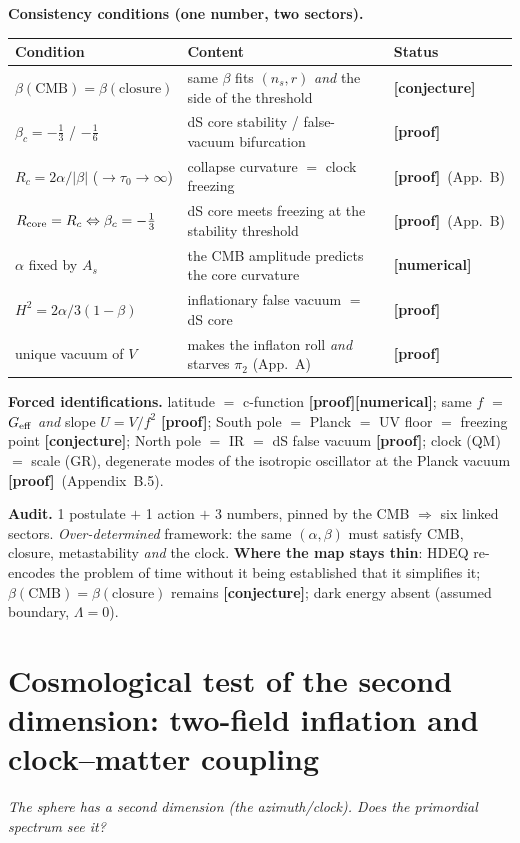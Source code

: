 \documentclass[11pt]{article}
\newcommand{\preuve}{{\small\textbf{[proof]}}}
\newcommand{\num}{{\small\textbf{[numerical]}}}
\newcommand{\conj}{{\small\textbf{[conjecture]}}}
\theoremstyle{definition}
\begin{document}
\noindent\textbf{Consistency conditions (one number, two sectors).}
\begin{center}\footnotesize
\begin{tabular}{p{4.6cm} p{6.6cm} l}
\toprule
\textbf{Condition} & \textbf{Content} & \textbf{Status}\\\midrule
$\beta(\text{CMB})=\beta(\text{closure})$ & same $\beta$ fits $(n_s,r)$ \emph{and} the side of the threshold & \conj\\
$\beta_c=-\tfrac13$ / $-\tfrac16$ & dS core stability / false-vacuum bifurcation & \preuve\\
$R_c=2\alpha/|\beta|$ ($\to\tau_0\!\to\!\infty$) & collapse curvature $=$ clock freezing & \preuve\ (App.~B)\\
$R_{\rm core}=R_c\Leftrightarrow\beta_c=-\tfrac13$ & dS core meets freezing at the stability threshold & \preuve\ (App.~B)\\
$\alpha$ fixed by $A_s$ & the CMB amplitude predicts the core curvature & \num\\
$H^2=2\alpha/3(1-\beta)$ & inflationary false vacuum $=$ dS core & \preuve\\
unique vacuum of $V$ & makes the inflaton roll \emph{and} starves $\pi_2$ (App.~A) & \preuve\\
\bottomrule
\end{tabular}
\end{center}

\noindent\textbf{Forced identifications.} latitude $=$ c-function \preuve\num; same $f$ $=$
$G_{\rm eff}$ \emph{and} slope $U=V/f^2$ \preuve; South pole $=$ Planck $=$ UV floor $=$ freezing point
\conj; North pole $=$ IR $=$ dS false vacuum \preuve; clock (QM) $=$ scale (GR), degenerate modes of the
isotropic oscillator at the Planck vacuum \preuve\ (Appendix~B.5).

\smallskip
\noindent\textbf{Audit.} 1 postulate $+$ 1 action $+$ 3 numbers, pinned by the CMB $\Rightarrow$ six
linked sectors. \emph{Over-determined} framework: the same $(\alpha,\beta)$ must satisfy CMB, closure,
metastability \emph{and} the clock. \textbf{Where the map stays thin}: HDEQ re-encodes the problem of time
without it being established that it simplifies it; $\beta(\text{CMB})=\beta(\text{closure})$ remains
\conj; dark energy absent (assumed boundary, $\Lambda=0$).

\section{Cosmological test of the second dimension: two-field inflation and clock--matter coupling}\label{ann:D}
\emph{The sphere has a second dimension (the azimuth/clock). Does the primordial spectrum see it?}
\end{document}
